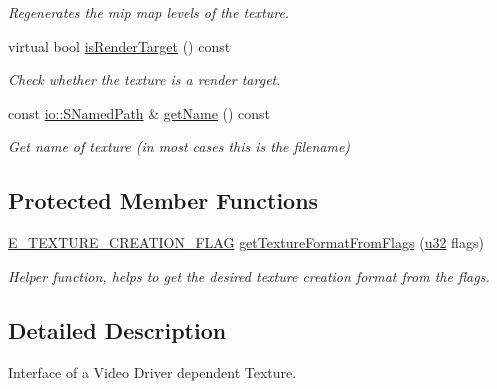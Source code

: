 \begin{DoxyCompactItemize}
\begin{DoxyCompactList}\small\item\em Regenerates the mip map levels of the texture. \end{DoxyCompactList}\item 
virtual bool \hyperlink{classirr_1_1video_1_1ITexture_aac5c0e281e1aa49365fdb7e7fa4d7342}{is\+Render\+Target} () const
\begin{DoxyCompactList}\small\item\em Check whether the texture is a render target. \end{DoxyCompactList}\item 
\mbox{\label{classirr_1_1video_1_1ITexture_ace31573b2a624446f15fe56d1e609810}} 
const \hyperlink{structirr_1_1io_1_1SNamedPath}{io\+::\+S\+Named\+Path} \& \hyperlink{classirr_1_1video_1_1ITexture_ace31573b2a624446f15fe56d1e609810}{get\+Name} () const
\begin{DoxyCompactList}\small\item\em Get name of texture (in most cases this is the filename) \end{DoxyCompactList}\end{DoxyCompactItemize}
\subsection*{Protected Member Functions}
\begin{DoxyCompactItemize}
\item 
\hyperlink{namespaceirr_1_1video_acaf6f7414534f7d62bff18c5bf11876f}{E\+\_\+\+T\+E\+X\+T\+U\+R\+E\+\_\+\+C\+R\+E\+A\+T\+I\+O\+N\+\_\+\+F\+L\+AG} \hyperlink{classirr_1_1video_1_1ITexture_afff3160f6aa5f749365ae4f776a440f3}{get\+Texture\+Format\+From\+Flags} (\hyperlink{namespaceirr_a0416a53257075833e7002efd0a18e804}{u32} flags)
\begin{DoxyCompactList}\small\item\em Helper function, helps to get the desired texture creation format from the flags. \end{DoxyCompactList}\end{DoxyCompactItemize}


\subsection{Detailed Description}
Interface of a Video Driver dependent Texture. 


